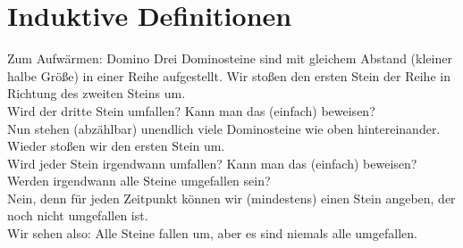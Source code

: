 



\section{Induktive Definitionen}

\begin{frame}{Zum Aufwärmen: Domino}
	Drei Dominosteine sind mit gleichem Abstand (kleiner halbe Größe) in einer Reihe aufgestellt. Wir stoßen den ersten Stein der Reihe in Richtung des zweiten Steins um. \\
	Wird der dritte Stein umfallen? Kann man das (einfach) beweisen? \\[1em]
	\pause
	Nun stehen (abzählbar) unendlich viele Dominosteine wie oben hintereinander. Wieder stoßen wir den ersten Stein um. \\
	Wird jeder Stein irgendwann umfallen? Kann man das (einfach) beweisen? \\[1em]
	\pause
	Werden irgendwann alle Steine umgefallen sein? \\
	\pause Nein, denn für jeden Zeitpunkt können wir (mindestens) einen Stein angeben, der noch nicht umgefallen ist.\\
	Wir sehen also: Alle Steine fallen um, aber es sind niemals alle umgefallen.
\end{frame}


